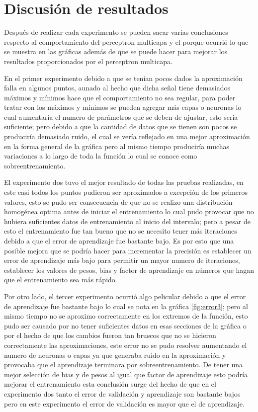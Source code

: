 \section{Discusión de resultados}
Después de realizar cada experimento se pueden sacar varias conclusiones respecto al comportamiento del perceptron multicapa y el porque ocurrió lo que se muestra en las gráficas además de que se puede hacer para mejorar los resultados proporcionados por el perceptron multicapa.

En el primer experimento debido a que se tenían pocos dados la aproximación falla en algunos puntos, aunado al hecho que dicha señal tiene demasiados máximos y mínimos hace que el comportamiento no sea regular, para poder tratar con los máximos y mínimos se pueden agregar más capas o neuronas lo cual aumentaría el numero de parámetros que se deben de ajustar, esto seria suficiente; pero debido a que la cantidad de datos que se tienen son pocos se produciría demasiado ruido, el cual se vería reflejado en una mejor aproximación en la forma general de la gráfica pero al mismo tiempo produciría muchas variaciones a lo largo de toda la función lo cual se conoce como sobreentrenamiento.

El experimento dos tuvo el mejor resultado de todas las pruebas realizadas, en este casi todos los puntos pudieron ser aproximados a excepción de los primeros valores, esto se pudo ser consecuencia de que no se realizo una distribución homogénea optima antes de iniciar el entrenamiento lo cual pudo provocar que no hubiera suficientes datos de entrenamiento al inicio del intervalo; pero a pesar de esto el entrenamiento fue tan bueno que no se necesito tener más iteraciones debido a que el error de aprendizaje fue bastante bajo. Es por esto que una posible mejora que se podría hacer para incrementar la precisión es establecer un error de aprendizaje más bajo para permitir un mayor numero de iteraciones, establecer los valores de pesos, bias y factor de aprendizaje en números que hagan que el entrenamiento sea más rápido.

Por otro lado, el tercer experimento ocurrió algo pelicular debido a que el error de aprendizaje fue bastante bajo lo cual se nota en la gráfica \ref{fig:error3}; pero al mismo tiempo no se aproximo correctamente en los extremos de la función, esto pudo ser causado por no tener suficientes datos en esas secciones de la gráfica o por el hecho de que los cambios fueron tan bruscos que no se hicieron correctamente las aproximaciones, este error no se pudo resolver aumentando el numero de neuronas o capas ya que generaba ruido en la aproximación y provocaba que el aprendizaje terminara por sobreentrenamiento. De tener una mejor selección de bias y de pesos al igual que factor de aprendizaje esto podría mejorar el entrenamiento esta conclusión surge del hecho de que en el experimento dos tanto el error de validación y aprendizaje son bastante bajos pero en este experimento el error de validación es mayor que el de aprendizaje.


